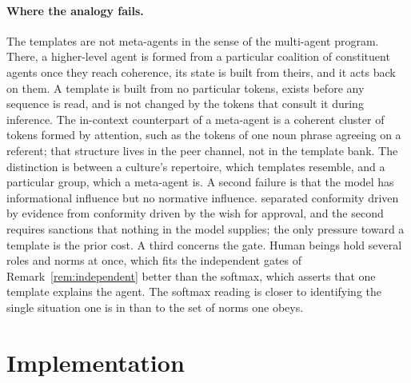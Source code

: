 \documentclass[11pt]{article}
\theoremstyle{definition}
\theoremstyle{remark}
\begin{document}
\paragraph{Where the analogy fails.}
The templates are not meta-agents in the sense of the multi-agent program. There, a higher-level agent is formed from a particular coalition of constituent agents once they reach coherence, its state is built from theirs, and it acts back on them. A template is built from no particular tokens, exists before any sequence is read, and is not changed by the tokens that consult it during inference. The in-context counterpart of a meta-agent is a coherent cluster of tokens formed by attention, such as the tokens of one noun phrase agreeing on a referent; that structure lives in the peer channel, not in the template bank. The distinction is between a culture's repertoire, which templates resemble, and a particular group, which a meta-agent is. A second failure is that the model has informational influence but no normative influence. \citet{deutsch1955} separated conformity driven by evidence from conformity driven by the wish for approval, and the second requires sanctions that nothing in the model supplies; the only pressure toward a template is the prior cost. A third concerns the gate. Human beings hold several roles and norms at once, which fits the independent gates of Remark~\ref{rem:independent} better than the softmax, which asserts that one template explains the agent. The softmax reading is closer to identifying the single situation one is in than to the set of norms one obeys.

\section{Implementation}
\end{document}
